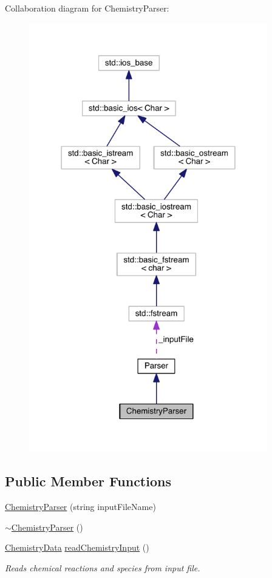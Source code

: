 Collaboration diagram for Chemistry\+Parser\+:\nopagebreak
\begin{figure}[H]
\begin{center}
\leavevmode
\includegraphics[width=294pt]{classChemistryParser__coll__graph}
\end{center}
\end{figure}
\subsection*{Public Member Functions}
\begin{DoxyCompactItemize}
\item 
\hyperlink{classChemistryParser_af054e9adc10a110223bdab9ed0a22adc}{Chemistry\+Parser} (string input\+File\+Name)
\item 
\hyperlink{classChemistryParser_a0918e9fb2e03ef37f920c1214b5286cf}{$\sim$\+Chemistry\+Parser} ()
\item 
\hyperlink{structChemistryData}{Chemistry\+Data} \hyperlink{classChemistryParser_a655de1a88016755e9dffae5081d00963}{read\+Chemistry\+Input} ()
\begin{DoxyCompactList}\small\item\em Reads chemical reactions and species from input file. \end{DoxyCompactList}\end{DoxyCompactItemize}

